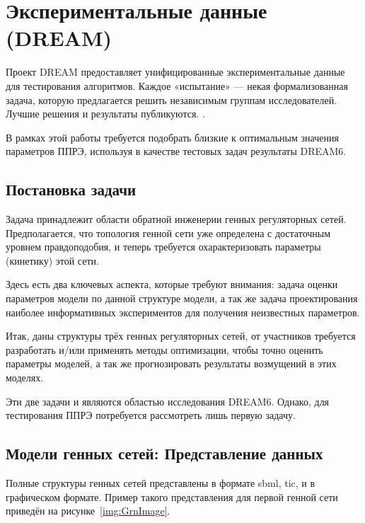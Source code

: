 \section{Экспериментальные данные (DREAM)} \label{s2}

Проект DREAM предоставляет унифицированные экспериментальные данные для 
тестирования алгоритмов. Каждое «испытание» — некая формализованная задача,
которую предлагается решить независимым группам исследователей. 
Лучшие решения и результаты публикуются. \cite{bib6}. 

В рамках этой работы требуется подобрать близкие к оптимальным значения 
параметров ППРЭ, используя в качестве тестовых задач результаты DREAM6.

\subsection{Постановка задачи} \label{s2_1}

Задача принадлежит области обратной инженерии генных регуляторных сетей. 
Предполагается, что топология генной сети уже определена с достаточным уровнем 
правдоподобия, и теперь требуется охарактеризовать параметры (кинетику) 
этой сети.

Здесь есть два ключевых аспекта, которые требуют внимания: задача оценки 
параметров модели по данной структуре модели, а так же задача проектирования 
наиболее информативных экспериментов для получения неизвестных параметров. 

Итак, даны структуры трёх генных регуляторных сетей, от участников требуется 
разработать и/или применять методы оптимизации, чтобы точно оценить 
параметры моделей, а так же прогнозировать результаты возмущений в этих моделях.

Эти две задачи и являются областью исследования DREAM6. Однако, для тестирования
ППРЭ потребуется рассмотреть лишь первую задачу.

\subsection{Модели генных сетей: Представление данных} \label{s2_2}

Полные структуры генных сетей представлены в формате sbml, tic, и в графическом 
формате. Пример такого представления для первой генной сети приведён на 
рисунке~\ref{img:GrnImage}.

